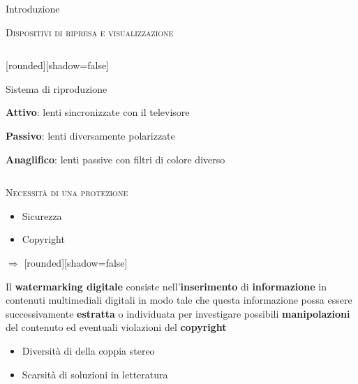 \documentclass{beamer}
\begin{document}
\begin{section}{Introduzione}
\begin{frame}[t]{\textsc{Dispositivi di ripresa e visualizzazione}}
\begin{columns}
\begin{column}{5cm}
\vspace{-2.8em}
\begin{center}
[rounded][shadow=false]
\begin{block}{Sistema di riproduzione}
		\begin{itemize}
			\item  \small{\textbf{Attivo}: lenti sincronizzate con il televisore
			\item \textbf{Passivo}: lenti diversamente polarizzate
			\item \textbf{Anaglifico}: lenti passive con filtri di colore diverso}
		\end{itemize}	
	\end{block}
\end{center}
\end{column}
\end{columns}
\end{frame}



\begin{frame}[t]{\textsc{Necessit\`{a} di una protezione}}

\begin{itemize}
\item  Sicurezza
\item  Copyright 
\end{itemize}
 \hspace{50 mm}$\mathbb{\Longrightarrow}$
[rounded][shadow=false]
\begin{block}{}
\center \small{Il \textbf{watermarking digitale} consiste nell'\textbf{inserimento} di \textbf{informazione} in contenuti  multimediali digitali in modo tale che questa informazione possa essere successivamente \textbf{estratta} o individuata per investigare possibili \textbf{manipolazioni} del contenuto ed eventuali violazioni del \textbf{copyright}}
\end{block}
\begin{itemize}
\item Diversit\`{a} di della coppia stereo 
\item Scarsit\`{a} di soluzioni in letteratura
\end{itemize}
\begin{columns}[T]
\begin{column}[T]{6cm}
\vspace{3em}


\end{column}
\end{columns}
\end{frame}
\end{section}
\end{document}

